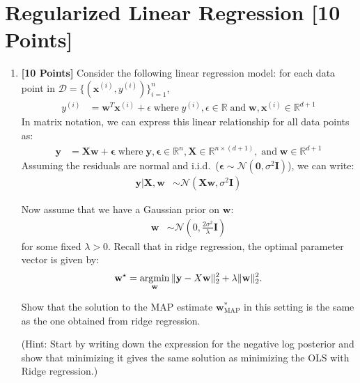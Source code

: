 \section{Regularized Linear Regression [10 Points]}

\begin{enumerate}

\item {\bf [10 Points]} Consider the following linear regression model: for each data point in $\mathcal{D} = \{(\bm{x}^{(i)}, y^{(i)})\}_{i=1}^n$,
\begin{align}
    y^{(i)} &= \bm{w}^T \bm{x}^{(i)} + \epsilon\; \text{where}\; y^{(i)}, \epsilon \in \mathbb{R}\; \text{and}\; \bm{w}, \bm{x}^{(i)} \in \mathbb{R}^{d+1} \nonumber
\end{align}
In matrix notation, we can express this linear relationship for all data points as:
\begin{align}
    \bm{y} &= \bm{X}\bm{w} + \bm{\epsilon}\; \text{where}\; \bm{y}, \bm{\epsilon} \in \mathbb{R}^n, \bm{X} \in \mathbb{R}^{n \times (d+1)},\; \text{and}\; \bm{w} \in \mathbb{R}^{d+1} \nonumber
\end{align}
Assuming the residuals are normal and i.i.d.\ ($\bm{\epsilon} \sim \mathcal{N}(\bm{0}, \sigma^2 \bm{I})$), we can write:
\begin{align}
    \bm{y}|\bm{X},\bm{w} &\sim \mathcal{N}(\bm{X}\bm{w}, \sigma^2 \bm{I}) \nonumber
\end{align}

Now assume that we have a Gaussian prior on $\bm{w}$:
\begin{align}
    \bm{w} &\sim \mathcal{N}\left(0,\frac{2\sigma^2}{\lambda}\bm{I}\right) \nonumber
\end{align}
for some fixed $\lambda > 0$. Recall that in ridge regression, the optimal parameter vector is given by:
\begin{align}
\mathbf{w}^\star = \mathop{\mathrm{argmin}}_{\mathbf{w}} \|\mathbf{y} - X\mathbf{w}\|_2^2 + \lambda \|\mathbf{w}\|_2^2. \nonumber
\end{align}

Show that the solution to the MAP estimate $\bm{w}^*_{\text{MAP}}$ in this setting is the same as the one obtained from ridge regression. 

(Hint: Start by writing down the expression for the negative log posterior and show that minimizing it gives the same solution as minimizing the OLS with Ridge regression.)

\begin{tcolorbox}[fit,height=9cm, width=0.95\textwidth, blank, borderline={1pt}{-2pt}]
\end{tcolorbox}


\end{enumerate}
